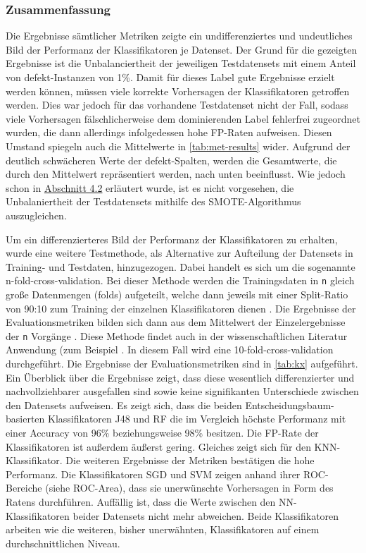 \subsubsection*{Zusammenfassung}
Die Ergebnisse sämtlicher Metriken zeigte ein undifferenziertes und undeutliches Bild der Performanz der Klassifikatoren je Datenset. Der Grund für die gezeigten Ergebnisse ist die Unbalanciertheit der jeweiligen Testdatensets mit einem Anteil von \glqq defekt\grqq -Instanzen von 1\%. Damit für dieses Label gute Ergebnisse erzielt werden können, müssen viele korrekte Vorhersagen der Klassifikatoren getroffen werden. Dies war jedoch für das vorhandene Testdatenset nicht der Fall, sodass viele Vorhersagen fälschlicherweise dem dominierenden Label \glqq fehlerfrei\grqq{} zugeordnet wurden, die dann allerdings infolgedessen hohe FP-Raten aufweisen. Diesen Umstand spiegeln auch die Mittelwerte in \autoref{tab:met-results} wider. Aufgrund der deutlich schwächeren Werte der \glqq defekt\grqq -Spalten, werden die Gesamtwerte, die durch den Mittelwert repräsentiert werden, nach unten beeinflusst. Wie jedoch schon in \hyperref[smote]{Abschnitt 4.2} erläutert wurde, ist es nicht vorgesehen, die Unbalaniertheit der Testdatensets mithilfe des SMOTE-Algorithmus auszugleichen.

Um ein differenzierteres Bild der Performanz der Klassifikatoren zu erhalten, wurde eine weitere Testmethode, als Alternative zur Aufteilung der Datensets in Training- und Testdaten, hinzugezogen. Dabei handelt es sich um die sogenannte \glqq n-fold-cross-validation\grqq. Bei dieser Methode werden die Trainingsdaten in \texttt{n} gleich große Datenmengen (\glqq folds\grqq) aufgeteilt, welche dann jeweils mit einer Split-Ratio von 90:10 zum Training der einzelnen Klassifikatoren dienen \cite{IanWitten}. Die Ergebnisse der Evaluationsmetriken bilden sich dann aus dem Mittelwert der Einzelergebnisse der \texttt{n} Vorgänge \cite{IanWitten}. Diese Methode findet auch in der wissenschaftlichen Literatur Anwendung (zum Beispiel \cite{Alam2013,Chawla2002,Alsaeedi2019}. In diesem Fall wird eine 10-fold-cross-validation durchgeführt. Die Ergebnisse der Evaluationsmetriken sind in \autoref{tab:kx} aufgeführt. Ein Überblick über die Ergebnisse zeigt, dass diese wesentlich differenzierter und nachvollziehbarer ausgefallen sind sowie keine signifikanten Unterschiede zwischen den Datensets aufweisen. Es zeigt sich, dass die beiden Entscheidungsbaum-basierten Klassifikatoren J48 und RF die im Vergleich höchste Performanz mit einer Accuracy von 96\% beziehungsweise 98\% besitzen. Die FP-Rate der Klassifikatoren ist außerdem äußerst gering. Gleiches zeigt sich für den KNN-Klassifikator. Die weiteren Ergebnisse der Metriken bestätigen die hohe Performanz. Die Klassifikatoren SGD und SVM zeigen anhand ihrer ROC-Bereiche (siehe ROC-Area), dass sie unerwünschte Vorhersagen in Form des \glqq Ratens\grqq{} durchführen. Auffällig ist, dass die Werte zwischen den NN-Klassifikatoren beider Datensets nicht mehr abweichen. Beide Klassifikatoren arbeiten wie die weiteren, bisher unerwähnten, Klassifikatoren auf einem durchschnittlichen Niveau.

